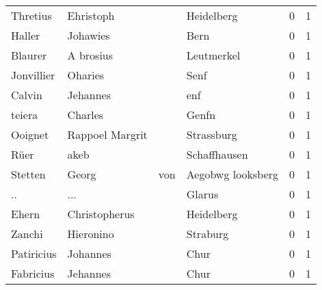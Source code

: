 \begin{center}
\begin{tiny}
\begin{longtabu}{llllrr}
                 Thretius &                          Ehristoph &             &                                  Heidelberg &          0 &         1 \\
                   Haller &                           Johawies &             &                                        Bern &          0 &         1 \\
                  Blaurer &                          A brosius &             &                                  Leutmerkel &          0 &         1 \\
               Jonvillier &                            Oharies &             &                                        Senf &          0 &         1 \\
                   Calvin &                           Jehannes &             &                                         enf &          0 &         1 \\
                   teiera &                            Charles &             &                                       Genfn &          0 &         1 \\
                  Ooignet &                    Rappoel Margrit &             &                                  Strassburg &          0 &         1 \\
                     Rüer &                               akeb &             &                                Schaffhausen &          0 &         1 \\
                  Stetten &                              Georg &         von &                           Aegobwg looksberg &          0 &         1 \\
                       .. &                                ... &             &                                      Glarus &          0 &         1 \\
                    Ehern &                      Christopherus &             &                                  Heidelberg &          0 &         1 \\
                   Zanchi &                          Hieronino &             &                                    Straburg &          0 &         1 \\
               Patiricius &                           Johannes &             &                                        Chur &          0 &         1 \\
                Fabricius &                           Jehannes &             &                                        Chur &          0 &         1 \\

\end{longtabu}
\end{tiny}
\end{center}

